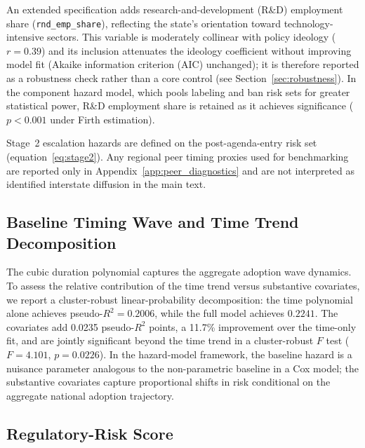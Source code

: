 \documentclass[12pt]{article}
\begin{document}
An extended specification adds research-and-development (R\&D) employment share (\texttt{rnd\_emp\_share}), reflecting the state's orientation toward technology-intensive sectors.  This variable is moderately collinear with policy ideology ($r = 0.39$) and its inclusion attenuates the ideology coefficient without improving model fit (Akaike information criterion (AIC) unchanged); it is therefore reported as a robustness check rather than a core control (see Section~\ref{sec:robustness}).  In the component hazard model, which pools labeling and ban risk sets for greater statistical power, R\&D employment share is retained as it achieves significance ($p < 0.001$ under Firth estimation).

Stage~2 escalation hazards are defined on the post-agenda-entry risk set (equation~\eqref{eq:stage2}).  Any regional peer timing proxies used for benchmarking are reported only in Appendix~\ref{app:peer_diagnostics} and are not interpreted as identified interstate diffusion in the main text.

\subsection{Baseline Timing Wave and Time Trend Decomposition}

The cubic duration polynomial captures the aggregate adoption wave dynamics.  To assess the relative contribution of the time trend versus substantive covariates, we report a cluster-robust linear-probability decomposition: the time polynomial alone achieves pseudo-$R^2 = 0.2006$, while the full model achieves $0.2241$.  The covariates add 0.0235 pseudo-$R^2$ points, a 11.7\% improvement over the time-only fit, and are jointly significant beyond the time trend in a cluster-robust $F$ test ($F = 4.101$, $p = 0.0226$).  In the hazard-model framework, the baseline hazard is a nuisance parameter analogous to the non-parametric baseline in a Cox model; the substantive covariates capture proportional shifts in risk conditional on the aggregate national adoption trajectory.

\subsection{Regulatory-Risk Score}
\end{document}
